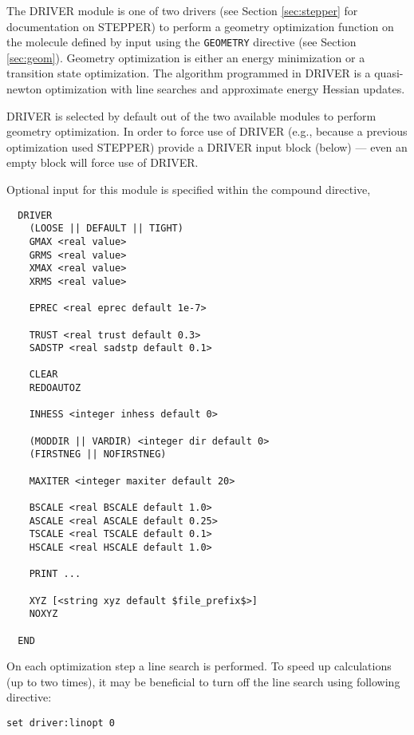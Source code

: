 %
%
\label{sec:driver}

The DRIVER module is one of two drivers (see Section \ref{sec:stepper}
for documentation on STEPPER) to perform a geometry optimization
function on the molecule defined by input using the \verb+GEOMETRY+
directive (see Section \ref{sec:geom}).  Geometry optimization is
either an energy minimization or a transition state optimization.
The algorithm programmed in DRIVER is a quasi-newton optimization
with line searches and approximate energy Hessian updates.

DRIVER is selected by default out of the two available modules to
perform geometry optimization.  In order to force use of DRIVER (e.g.,
because a previous optimization used STEPPER) provide a DRIVER input
block (below) --- even an empty block will force use of DRIVER.

Optional input for this module is specified within the compound
directive,
\begin{verbatim}
  DRIVER 
    (LOOSE || DEFAULT || TIGHT)
    GMAX <real value>
    GRMS <real value>
    XMAX <real value>
    XRMS <real value>

    EPREC <real eprec default 1e-7>

    TRUST <real trust default 0.3>
    SADSTP <real sadstp default 0.1>

    CLEAR
    REDOAUTOZ

    INHESS <integer inhess default 0>

    (MODDIR || VARDIR) <integer dir default 0>
    (FIRSTNEG || NOFIRSTNEG)

    MAXITER <integer maxiter default 20>

    BSCALE <real BSCALE default 1.0>
    ASCALE <real ASCALE default 0.25>
    TSCALE <real TSCALE default 0.1>
    HSCALE <real HSCALE default 1.0>
   
    PRINT ...

    XYZ [<string xyz default $file_prefix$>]
    NOXYZ

  END
\end{verbatim}

On each optimization step a line search is performed.
To speed up calculations (up to two times), it may be beneficial
to turn off the line search using following directive:
\begin{verbatim}
set driver:linopt 0
\end{verbatim}

\sloppy

